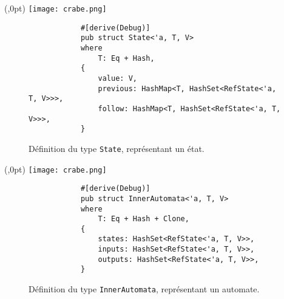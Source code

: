 \documentclass[aspectratio=169,xcolor=dvipsnames]{beamer}
\begin{document}


\begin{frame}[fragile]
    \begin{textblock*}{20pt}(\textwidth-70pt,0pt)
        \texttt{[image: crabe.png]}
    \end{textblock*}
    \begin{figure}  
        \begin{verbatim}
            #[derive(Debug)]
            pub struct State<'a, T, V>
            where
                T: Eq + Hash,
            {
                value: V,
                previous: HashMap<T, HashSet<RefState<'a, T, V>>>,
                follow: HashMap<T, HashSet<RefState<'a, T, V>>>,
            }
        \end{verbatim}
        \caption{
            Définition du type \texttt{State}, représentant un 
            état.
        }
    \end{figure}  
\end{frame}




\begin{frame}[fragile]
    \begin{textblock*}{20pt}(\textwidth-70pt,0pt)
        \texttt{[image: crabe.png]}
    \end{textblock*}
    \begin{figure}  
        \begin{verbatim}
            #[derive(Debug)]
            pub struct InnerAutomata<'a, T, V>
            where
                T: Eq + Hash + Clone,
            {
                states: HashSet<RefState<'a, T, V>>,
                inputs: HashSet<RefState<'a, T, V>>,
                outputs: HashSet<RefState<'a, T, V>>,
            }
        \end{verbatim}
        \caption{
            Définition du type \texttt{InnerAutomata}, représentant
            un automate.
        }
    \end{figure}  
\end{frame}


\end{document}
